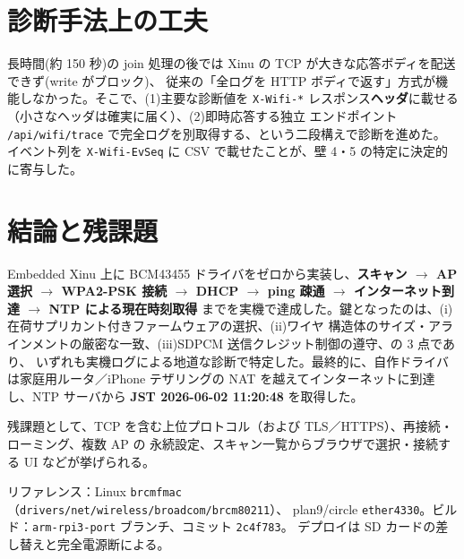 \documentclass[a4paper,11pt]{ltjsarticle}
\begin{document}
\section{診断手法上の工夫}
長時間(約 150 秒)の join 処理の後では Xinu の TCP が大きな応答ボディを配送できず(write がブロック)、
従来の「全ログを HTTP ボディで返す」方式が機能しなかった。そこで、(1)主要な診断値を
\texttt{X-Wifi-*} レスポンス\textbf{ヘッダ}に載せる（小さなヘッダは確実に届く）、(2)即時応答する独立
エンドポイント \texttt{/api/wifi/trace} で完全ログを別取得する、という二段構えで診断を進めた。
イベント列を \texttt{X-Wifi-EvSeq} に CSV で載せたことが、壁 4・5 の特定に決定的に寄与した。

\section{結論と残課題}
Embedded Xinu 上に BCM43455 ドライバをゼロから実装し、\textbf{スキャン $\to$ AP 選択 $\to$
WPA2-PSK 接続 $\to$ DHCP $\to$ ping 疎通 $\to$ インターネット到達 $\to$ NTP による現在時刻取得}
までを実機で達成した。鍵となったのは、(i)在荷サプリカント付きファームウェアの選択、(ii)ワイヤ
構造体のサイズ・アラインメントの厳密な一致、(iii)SDPCM 送信クレジット制御の遵守、の 3 点であり、
いずれも実機ログによる地道な診断で特定した。最終的に、自作ドライバは家庭用ルータ／iPhone テザリングの
NAT を越えてインターネットに到達し、NTP サーバから \textbf{JST 2026-06-02 11:20:48} を取得した。

残課題として、TCP を含む上位プロトコル（および TLS／HTTPS）、再接続・ローミング、複数 AP の
永続設定、スキャン一覧からブラウザで選択・接続する UI などが挙げられる。

\vspace{4mm}
\noindent\footnotesize
リファレンス：Linux \texttt{brcmfmac}（\texttt{drivers/net/wireless/broadcom/brcm80211}）、
plan9/circle \texttt{ether4330}。ビルド：\texttt{arm-rpi3-port} ブランチ、コミット \texttt{2c4f783}。
デプロイは SD カードの差し替えと完全電源断による。
\end{document}
